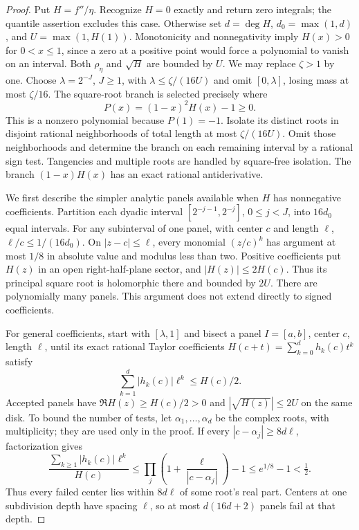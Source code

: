 \begin{proof}
Put $H=f''/\eta$. Recognize $H=0$ exactly and return zero integrals;
the quantile assertion excludes this case. Otherwise set $d=\deg H$,
$d_0=\max(1,d)$, and $U=\max(1,H(1))$. Monotonicity and
nonnegativity imply $H(x)>0$ for $0<x\le1$, since a zero at a positive
point would force a polynomial to vanish on an interval. Both $\rho_\eta$
and $\sqrt H$ are bounded by $U$. We may replace $\zeta>1$ by one.
Choose $\lambda=2^{-J}$, $J\ge1$, with
$\lambda\le\zeta/(16U)$ and omit $[0,\lambda]$, losing mass at most
$\zeta/16$. The square-root branch is selected precisely where
\[
 P(x)=(1-x)^2H(x)-1\ge0.
\]
This is a nonzero polynomial because $P(1)=-1$. Isolate its distinct
roots in disjoint rational neighborhoods of total length at most
$\zeta/(16U)$. Omit those neighborhoods and determine the branch on
each remaining interval by a rational sign test. Tangencies and
multiple roots are handled by square-free isolation. The branch
$(1-x)H(x)$ has an exact rational antiderivative.

We first describe the simpler analytic panels available when $H$ has
nonnegative coefficients. Partition each dyadic interval
$[2^{-j-1},2^{-j}]$, $0\le j<J$, into $16d_0$ equal intervals.
For any subinterval of one panel, with center $c$ and length $\ell$,
$\ell/c\le1/(16d_0)$. On $|z-c|\le\ell$, every monomial
$(z/c)^k$ has argument at most $1/8$ in absolute value and modulus
less than two. Positive coefficients put $H(z)$ in an open right-half-plane
sector, and $|H(z)|\le2H(c)$. Thus its principal square root is
holomorphic there and bounded by $2U$. There are polynomially many
panels. This argument does not extend directly to signed coefficients.

For general coefficients, start with $[\lambda,1]$ and bisect a panel
$I=[a,b]$, center $c$, length $\ell$, until its exact rational Taylor
coefficients $H(c+t)=\sum_{k=0}^dh_k(c)t^k$ satisfy
\begin{equation}\label{eq:taylor-panel-certificate}
 \sum_{k=1}^d|h_k(c)|\ell^k\le H(c)/2.
\end{equation}
Accepted panels have $\Re H(z)\ge H(c)/2>0$ and
$|\sqrt{H(z)}|\le2U$ on the same disk. To bound the number of tests,
let $\alpha_1,\ldots,\alpha_d$ be the complex roots, with multiplicity;
they are used only in the proof. If every $|c-\alpha_j|\ge8d\ell$,
factorization gives
\[
 \frac{\sum_{k\ge1}|h_k(c)|\ell^k}{H(c)}
 \le\prod_j\left(1+\frac\ell{|c-\alpha_j|}\right)-1
 \le e^{1/8}-1<\tfrac12.
\]
Thus every failed center lies within $8d\ell$ of some root's real
part. Centers at one subdivision depth have spacing $\ell$, so at
most $d(16d+2)$ panels fail at that depth.


\end{proof}
